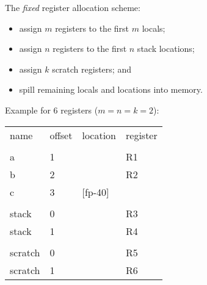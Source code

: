 \begin{slide*}
\renewcommand{\arraystretch}{0.9}
The {\em fixed\/} register allocation scheme:
\begin{itemize}
\item assign $m$ registers to the first $m$ locals;
\item assign $n$ registers to the first $n$ stack locations;
\item assign $k$ scratch registers; and
\item spill remaining locals and locations into memory.
\end{itemize}
\vspace*{2em}
Example for 6 registers ($m=n=k=2$):
\begin{center}
\begin{scriptsize}
\begin{tt}
\begin{tabular}{l@{~~~}l@{~~~}l@{~~~}l}
name & offset & location & register \\
\\
              a    & 1  &           &  R1 \\
              b    & 2  &           &  R2 \\
              c    & 3  &  [fp-40]  &   \\
  \\
            stack  & 0  &           &  R3 \\
            stack  & 1  &           &  R4 \\
  \\
            scratch& 0  &           &  R5 \\
            scratch& 1  &           &  R6
\end{tabular}
\end{tt}
\end{scriptsize}
\end{center}
\vfil
\renewcommand{\arraystretch}{1}
\end{slide*}
 
